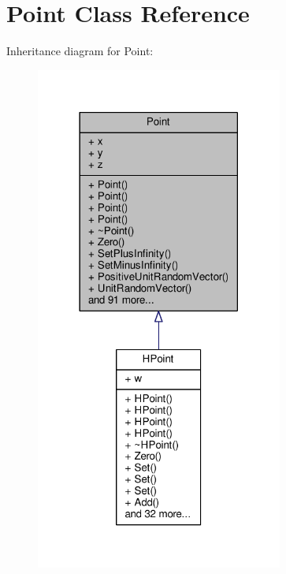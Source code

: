 \hypertarget{classPoint}{}\section{Point Class Reference}
\label{classPoint}


Inheritance diagram for Point\+:
\nopagebreak
\begin{figure}[H]
\begin{center}
\leavevmode
\includegraphics[width=230pt]{d3/d59/classPoint__inherit__graph}
\end{center}
\end{figure}


